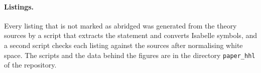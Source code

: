 \paragraph{Listings.} Every listing that is not marked as abridged was generated from the theory
sources by a script that extracts the statement and converts Isabelle symbols, and a second script checks
each listing against the sources after normalising white space. The scripts and the data behind the
figures are in the directory \texttt{paper\_hhl} of the repository.
